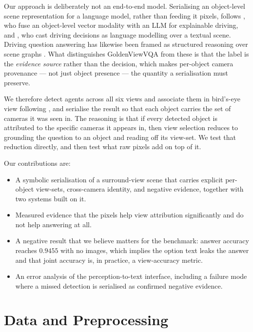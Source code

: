 \documentclass[11pt]{article}
\begin{document}
Our approach is deliberately not an end-to-end model. Serialising an
object-level scene representation for a language model, rather than feeding it
pixels, follows \citet{chen2024driving}, who fuse an object-level vector
modality with an LLM for explainable driving, and \citet{mao2023gptdriver},
who cast driving decisions as language modelling over a textual scene. Driving
question answering has likewise been framed as structured reasoning over scene
graphs \citep{sima2024drivelm}. What distinguishes GoldenViewVQA from these is
that the label is the \emph{evidence source} rather than the decision, which
makes per-object camera provenance --- not just object presence --- the
quantity a serialisation must preserve.

We therefore detect agents across all six views and associate them in
bird's-eye view following \citet{gaafar2025geodrive}, and serialise the result
so that each object carries the set of cameras it was seen in. The reasoning is
that if every detected object is attributed to the specific cameras it appears
in, then view selection reduces to grounding the question to an object and
reading off its view-set. We test that reduction directly, and then test what
raw pixels add on top of it.

Our contributions are:

\begin{itemize}
  \item A symbolic serialisation of a surround-view scene that carries
        explicit per-object view-sets, cross-camera identity, and negative
        evidence, together with two systems built on it.
  \item Measured evidence that the pixels help view attribution significantly
        and do not help answering at all.
  \item A negative result that we believe matters for the benchmark: answer
        accuracy reaches $0.9455$ with no images, which implies the option
        text leaks the answer and that joint accuracy is, in practice, a
        view-accuracy metric.
  \item An error analysis of the perception-to-text interface, including a
        failure mode where a missed detection is serialised as confirmed
        negative evidence.
\end{itemize}

\section{Data and Preprocessing}
\label{sec:data}
\end{document}
